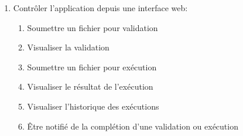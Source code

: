 \begin{enumerate}
\begin{enumerate}
    \end{enumerate}
    \item Contrôler l'application depuis une interface web:
    \begin{enumerate}
        \item Soumettre un fichier pour validation
        \item Visualiser la validation
        \item Soumettre un fichier pour exécution
        \item Visualiser le résultat de l'exécution
        \item Visualiser l'historique des exécutions
        \item Être notifié de la complétion d'une validation ou exécution
    \end{enumerate}
\end{enumerate}
